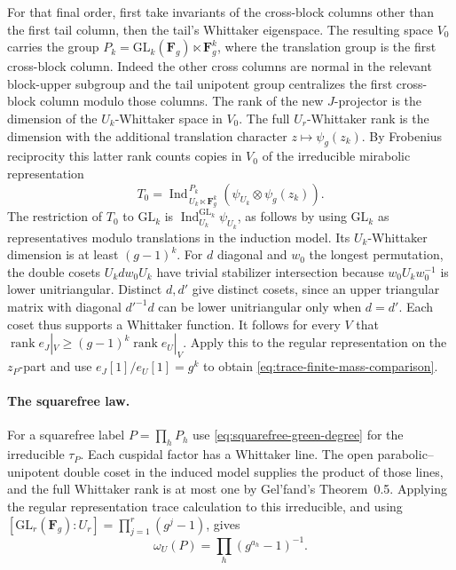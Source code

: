 For that final order, first take invariants of the cross-block
columns other than the first tail column, then the tail's Whittaker
eigenspace. The resulting space \(V_0\) carries the group
\(P_k=\mathrm{GL}_k(\mathbf F_g)\ltimes\mathbf F_g^k\), where the
translation group is the first cross-block column. Indeed the other
cross columns are normal in the relevant block-upper subgroup and
the tail unipotent group centralizes the first cross-block column
modulo those columns. The rank of the new \(J\)-projector is the
dimension of the \(U_k\)-Whittaker space in \(V_0\). The full
\(U_r\)-Whittaker rank is the dimension with the additional
translation character \(z\mapsto\psi_g(z_k)\).
By Frobenius reciprocity this latter rank counts copies in \(V_0\)
of the irreducible mirabolic representation
\[
 T_0=\operatorname{Ind}_{\,U_k\ltimes\mathbf F_g^k}^{\,P_k}
       (\psi_{U_k}\otimes\psi_g(z_k)).
\]
\cite[Proposition~1.2, p.~18]{tr3gelfand}
The restriction of \(T_0\) to \(\mathrm{GL}_k\) is
\(\operatorname{Ind}_{U_k}^{\mathrm{GL}_k}\psi_{U_k}\), as follows by
using \(\mathrm{GL}_k\) as representatives modulo translations in
the induction model. Its \(U_k\)-Whittaker dimension is at least
\((g-1)^k\). For \(d\) diagonal and \(w_0\) the longest permutation,
the double cosets \(U_k d w_0 U_k\) have trivial stabilizer
intersection because \(w_0 U_k w_0^{-1}\) is lower unitriangular.
Distinct \(d,d'\) give distinct cosets, since an upper triangular
matrix with diagonal \(d'^{-1}d\) can be lower unitriangular only
when \(d=d'\). Each coset thus supports a Whittaker function.
It follows for every \(V\) that
\(\operatorname{rank} e_J|_V\ge(g-1)^k\operatorname{rank} e_U|_V\).
Apply this to the regular representation on the \(z_P\)-part and use
\(e_J[1]/e_U[1]=g^k\) to obtain \eqref{eq:trace-finite-mass-comparison}.

\paragraph{The squarefree law.}
For a squarefree label \(P=\prod_h P_h\) use
\eqref{eq:squarefree-green-degree} for the irreducible \(\tau_P\).
Each cuspidal factor has a Whittaker line.
\cite[Theorem~0.5 and Theorems~2.3 and~3.3]{tr3gelfand}
The open parabolic--unipotent double coset in the induced model
supplies the product of those lines, and the full Whittaker rank
is at most one by Gel'fand's Theorem~0.5. Applying the regular
representation trace calculation to this irreducible, and using
\([\mathrm{GL}_r(\mathbf F_g):U_r]=\prod_{j=1}^r(g^j-1)\), gives
\[
 \omega_U(P)=\prod_h (g^{a_h}-1)^{-1}.
\]

